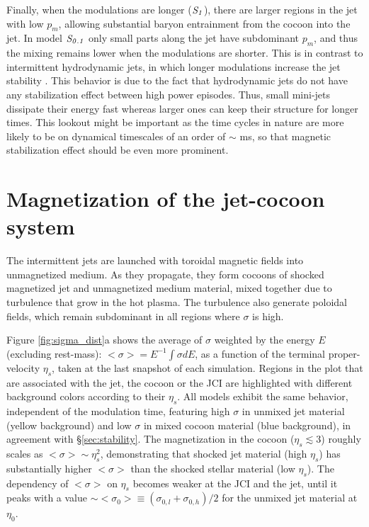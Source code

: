 \documentclass[fleqn,usenatbib]{mnras}
\newcommand{\Sa}{{\it S_{0.1}}}
\newcommand{\Sb}{{\it S_{1}}}
\newcommand{\sigl}{{\sigma_{0,l}}}
\newcommand{\sigh}{{\sigma_{0,h}}}
\newcommand{\sigz}{{<\sigma_0>}}
\begin{document}
	Finally, when the modulations are longer ($ \Sb $), there are larger regions in the jet with low $ p_m $, allowing substantial baryon entrainment from the cocoon into the jet. In model $ \Sa $ only small parts along the jet have subdominant $ p_m $, and thus the mixing remains lower when the modulations are shorter.
	This is in contrast to intermittent hydrodynamic jets, in which longer modulations increase the jet stability \citep{Gottlieb2020a}. This behavior is due to the fact that hydrodynamic jets do not have any stabilization effect between high power episodes. Thus, small mini-jets dissipate their energy fast whereas larger ones can keep their structure for longer times. This lookout might be important as the time cycles in nature are more likely to be on dynamical timescales of an order of $ \sim $ ms, so that magnetic stabilization effect should be even more prominent.
	
	\section{Magnetization of the jet-cocoon system}
	\label{sec:magnetization}
	
	The intermittent jets are launched with toroidal magnetic fields into unmagnetized medium. As they propagate, they form cocoons of shocked magnetized jet and unmagnetized medium material, mixed together due to turbulence that grow in the hot plasma. The turbulence also generate poloidal fields, which remain subdominant in all regions where $ \sigma $ is high.
	
	Figure \ref{fig:sigma_dist}a shows the average of $ \sigma $ weighted by the energy $ E $ (excluding rest-mass): $ <\sigma> = E^{-1} \int \sigma dE $, as a function of the terminal proper-velocity $ \eta_s $, taken at the last snapshot of each simulation. Regions in the plot that are associated with the jet, the cocoon or the JCI are highlighted with different background colors according to their $ \eta_s $.
	All models exhibit the same behavior, independent of the modulation time, featuring high $ \sigma $ in unmixed jet material (yellow background) and low $ \sigma $ in mixed cocoon material (blue background), in agreement with \S \ref{sec:stability}. The magnetization in the cocoon ($ \eta_s \lesssim 3 $) roughly scales as $ <\sigma> \sim \eta_s^2 $, demonstrating that shocked jet material (high $ \eta_s $) has substantially higher $ <\sigma> $ than the shocked stellar material (low $ \eta_s $). The dependency of $ <\sigma> $ on $ \eta_s $ becomes weaker at the JCI and the jet, until it peaks with a value $ \sim \sigz \equiv (\sigl+\sigh)/2 $ for the unmixed jet material at $ \eta_0 $.
	
\end{document}
